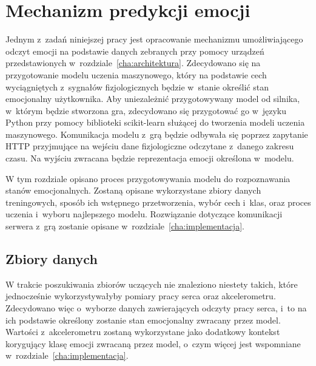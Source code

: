 \chapter{Mechanizm predykcji emocji}
\label{cha:predykcja}
Jednym z~zadań niniejszej pracy jest opracowanie mechanizmu umożliwiającego odczyt emocji na podstawie danych zebranych przy pomocy urządzeń przedstawionych w~rozdziale~\ref{cha:architektura}. Zdecydowano się na przygotowanie modelu uczenia maszynowego, który na podstawie cech wyciągniętych z~sygnałów fizjologicznych będzie w~stanie określić stan emocjonalny użytkownika. Aby uniezależnić przygotowywany model od silnika, w~którym będzie stworzona gra, zdecydowano się przygotować go w~języku Python przy pomocy biblioteki scikit-learn służącej do tworzenia modeli uczenia maszynowego. Komunikacja modelu z~grą będzie odbywała się poprzez zapytanie HTTP przyjmujące na wejściu dane fizjologiczne odczytane z~danego zakresu czasu. Na wyjściu zwracana będzie reprezentacja emocji określona w~modelu. 

W tym rozdziale opisano proces przygotowywania modelu do rozpoznawania stanów emocjonalnych. Zostaną opisane wykorzystane zbiory danych treningowych, sposób ich wstępnego przetworzenia, wybór cech i~klas, oraz proces uczenia i~wyboru najlepszego modelu. Rozwiązanie dotyczące komunikacji serwera z~grą zostanie opisane w~rozdziale~\ref{cha:implementacja}.
\section{Zbiory danych}
W trakcie poszukiwania zbiorów uczących nie znaleziono niestety takich, które jednocześnie wykorzystywałyby pomiary pracy serca oraz akcelerometru. Zdecydowano więc o~wyborze danych zawierających odczyty pracy serca, i~to na ich podstawie określony zostanie stan emocjonalny zwracany przez model. Wartości z~akcelerometru zostaną wykorzystane jako dodatkowy kontekst korygujący klasę emocji zwracaną przez model, o~czym więcej jest wspomniane w~rozdziale~\ref{cha:implementacja}.


